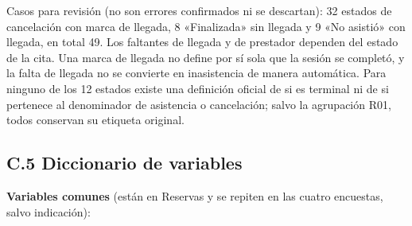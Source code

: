 \documentclass[11pt,letterpaper]{article}
\begin{document}
Casos para revisión (no son errores confirmados ni se descartan): 32 estados de cancelación con marca de llegada, 8 «Finalizada» sin llegada y 9 «No asistió» con llegada, en total 49. Los faltantes de llegada y de prestador dependen del estado de la cita. Una marca de llegada no define por sí sola que la sesión se completó, y la falta de llegada no se convierte en inasistencia de manera automática. Para ninguno de los 12 estados existe una definición oficial de si es terminal ni de si pertenece al denominador de asistencia o cancelación; salvo la agrupación R01, todos conservan su etiqueta original.

\subsection*{C.5 Diccionario de variables}

\textbf{Variables comunes} (están en Reservas y se repiten en las cuatro encuestas, salvo indicación):
\end{document}
